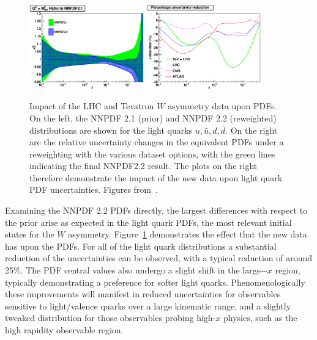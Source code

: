 \begin{figure}[hp!]
  \includegraphics[width=0.44\textwidth]{6-LHCimpact/figs/xdbar-nnpdf22.eps}
    \includegraphics[width=0.44\textwidth]{6-LHCimpact/figs/dbar-perc.eps}

  \caption[Impact of the LHC and Tevatron $W$ asymmetry data upon PDFs]{Impact of the LHC and Tevatron $W$ asymmetry data upon PDFs. On the left, the NNPDF 2.1 (prior) and NNPDF 2.2 (reweighted) distributions are shown for the light quarks $u,\bar{u},d,\bar{d}$. On the right are the relative uncertainty changes in the equivalent PDFs under a reweighting with the various dataset options, with the green lines indicating the final NNPDF2.2 result. The plots on the right therefore demonstrate the impact of the new data upon light quark PDF uncertainties. Figures from~\cite{Ball:2011gg}.}
 \label{fig:22pdfimpact}
\end{figure}


Examining the NNPDF 2.2 PDFs directly, the largest differences with respect to the prior arise as expected in the light quark PDFs, the most relevant initial states for the $W$ asymmetry. Figure~\ref{fig:22pdfimpact} demonstrates the effect that the new data has upon the PDFs. For all of the light quark distributions a substantial reduction of the uncertainties can be observed, with a typical reduction of around 25\%. The PDF central values also undergo a slight shift in the large$-x$ region, typically demonstrating a preference for softer light quarks. Phenomenologically these improvements will manifest in reduced uncertainties for observables sensitive to light/valence quarks over a large kinematic range, and a slightly tweaked distribution for those observables probing high-$x$ physics, such as the high rapidity observable region.


